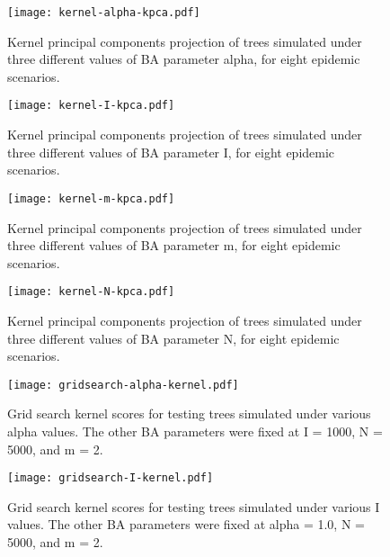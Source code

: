 \clearpage

\begin{figure}[ht]
  \centering
  \texttt{[image: kernel-alpha-kpca.pdf]}
  \caption{
    Kernel principal components projection of trees simulated under three
    different values of \gls{BA} parameter \gls{alpha}, for eight epidemic
    scenarios.
  }
  \label{fig:alphakpca}
\end{figure}

\begin{figure}[ht]
  \centering
  \texttt{[image: kernel-I-kpca.pdf]}
  \caption{
    Kernel principal components projection of trees simulated under three
    different values of \gls{BA} parameter \gls{I}, for eight epidemic
    scenarios.
  }
  \label{fig:Ikpca}
\end{figure}

\begin{figure}[ht]
  \centering
  \texttt{[image: kernel-m-kpca.pdf]}
  \caption{
    Kernel principal components projection of trees simulated under three
    different values of \gls{BA} parameter \gls{m}, for eight epidemic
    scenarios.
  }
  \label{fig:mkpca}
\end{figure}

\begin{figure}[ht]
  \centering
  \texttt{[image: kernel-N-kpca.pdf]}
  \caption{
    Kernel principal components projection of trees simulated under three
    different values of \gls{BA} parameter \gls{N}, for eight epidemic
    scenarios.
  }
  \label{fig:Nkpca}
\end{figure}

\clearpage

\begin{figure}[ht]
  \centering
  \texttt{[image: gridsearch-alpha-kernel.pdf]}
  \caption{                                              
    Grid search kernel scores for testing trees simulated under various             
    \gls{alpha} values. The other \gls{BA} parameters were fixed at \gls{I} =
    1000, \gls{N} = 5000, and \gls{m} = 2. 
  }        
  \label{fig:gridalpha}
\end{figure}

\begin{figure}[ht]
  \centering
  \texttt{[image: gridsearch-I-kernel.pdf]}
  \caption{                                              
    Grid search kernel scores for testing trees simulated under various             
    \gls{I} values. The other \gls{BA} parameters were fixed at \gls{alpha} =
    1.0, \gls{N} = 5000, and \gls{m} = 2. 
  }        
  \label{fig:gridI}
\end{figure}

